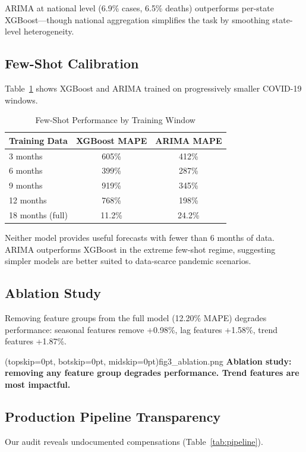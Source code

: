 \documentclass{ieeeaccess}
\begin{document}
ARIMA at national level (6.9\% cases, 6.5\% deaths) outperforms per-state XGBoost---though national aggregation simplifies the task by smoothing state-level heterogeneity.

\subsection{Few-Shot Calibration}
Table~\ref{tab:fewshot} shows XGBoost and ARIMA trained on progressively smaller COVID-19 windows.

\begin{table}[h]
\centering
\caption{Few-Shot Performance by Training Window}
\label{tab:fewshot}
\small
\begin{tabular}{lcc}
\toprule
Training Data & XGBoost MAPE & ARIMA MAPE \\
\midrule
3 months & 605\% & 412\% \\
6 months & 399\% & 287\% \\
9 months & 919\% & 345\% \\
12 months & 768\% & 198\% \\
18 months (full) & 11.2\% & 24.2\% \\
\bottomrule
\end{tabular}
\end{table}

Neither model provides useful forecasts with fewer than 6 months of data. ARIMA outperforms XGBoost in the extreme few-shot regime, suggesting simpler models are better suited to data-scarce pandemic scenarios.

\subsection{Ablation Study}
Removing feature groups from the full model (12.20\% MAPE) degrades performance: seasonal features remove +0.98\%, lag features +1.58\%, trend features +1.87\%.

\Figure[t!](topskip=0pt, botskip=0pt, midskip=0pt){fig3_ablation.png}
{\textbf{Ablation study: removing any feature group degrades performance. Trend features are most impactful.}\label{fig:ablation}}

\subsection{Production Pipeline Transparency}
Our audit reveals undocumented compensations (Table~\ref{tab:pipeline}).
\end{document}
